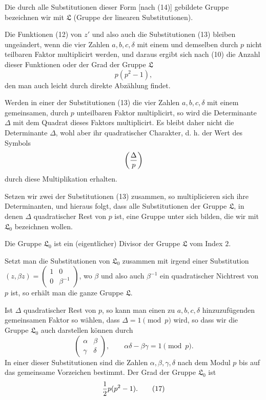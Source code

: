 \documentclass[11pt]{article}
\begin{document}
Die durch alle Substitutionen dieser Form [nach (14)] gebildete Gruppe bezeichnen wir mit $\mathfrak L$ (Gruppe der linearen Substitutionen).

Die Funktionen (12) von $z'$ und also auch die Substitutionen (13) bleiben ungeändert, wenn die vier Zahlen $a,b,c,\delta$ mit einem und demselben durch $p$ nicht teilbaren Faktor multiplicirt werden, und daraus ergibt sich nach (10) die Anzahl dieser Funktionen oder der Grad der Gruppe $\mathfrak L$
\begin{equation}
 p(p^2-1),
\tag{15}
\end{equation}
den man auch leicht durch direkte Abzählung findet.

Werden in einer der Substitutionen (13) die vier Zahlen $a,b,c,\delta$ mit einem gemeinsamen, durch $p$ unteilbaren Faktor multiplicirt, so wird die Determinante $\Delta$ mit dem Quadrat dieses Faktors multiplicirt. Es bleibt daher nicht die Determinante $\Delta$, wohl aber ihr quadratischer Charakter, d. h. der Wert des Symbols
\[
 \left({\Delta\over p}\right)
\]
durch diese Multiplikation erhalten.

Setzen wir zwei der Substitutionen (13) zusammen, so multiplicieren sich ihre Determinanten, und hieraus folgt, dass alle Substitutionen der Gruppe $\mathfrak L$, in denen $\Delta$ quadratischer Rest von $p$ ist, eine Gruppe unter sich bilden, die wir mit $\mathfrak L_0$ bezeichnen wollen.

Die Gruppe $\mathfrak L_0$ ist ein (eigentlicher) Divisor der Gruppe $\mathfrak L$ vom Index $2$.

Setzt man die Substitutionen von $\mathfrak L_0$ zusammen mit irgend einer Substitution $(z,\beta z)=\begin{pmatrix}1&0\\ 0&\beta^{-1}\end{pmatrix}$, wo $\beta$ und also auch $\beta^{-1}$ ein quadratischer Nichtrest von $p$ ist, so erhält man die ganze Gruppe $\mathfrak L$.

Ist $\Delta$ quadratischer Rest von $p$, so kann man einen zu $a,b,c,\delta$ hinzuzufügenden gemeinsamen Faktor so wählen, dass $\Delta=1\pmod p$ wird, so dass wir die Gruppe $\mathfrak L_0$ auch darstellen können durch
\begin{equation}
\begin{pmatrix}\alpha&\beta\\ \gamma&\delta\end{pmatrix},
\qquad
\alpha\delta-\beta\gamma=1\pmod p.
\tag{16}
\end{equation}
In einer dieser Substitutionen sind die Zahlen $\alpha,\beta,\gamma,\delta$ nach dem Modul $p$ bis auf das gemeinsame Vorzeichen bestimmt. Der Grad der Gruppe $\mathfrak L_0$ ist
\begin{equation}
 {1\over2}p(p^2-1).
\tag{17}
\end{equation}
\end{document}
